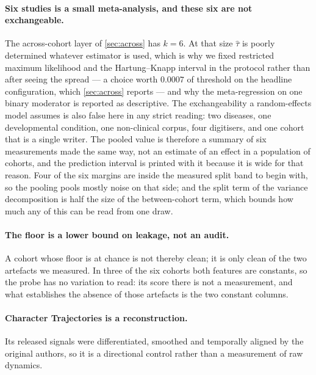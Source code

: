 \documentclass[10pt,a4paper]{article}
\begin{document}
\paragraph{Six studies is a small meta-analysis, and these six are not exchangeable.} The
across-cohort layer of \cref{sec:across} has $k = 6$. At that size $\hat\tau$ is poorly determined
whatever estimator is used, which is why we fixed restricted maximum likelihood and the
Hartung--Knapp interval in the protocol rather than after seeing the spread --- a choice worth
$0.0007$ of threshold on the headline configuration, which \cref{sec:across} reports --- and why the
meta-regression on one binary moderator is reported as descriptive. The exchangeability a
random-effects model assumes is also false here in any strict reading: two diseases, one
developmental condition, one non-clinical corpus, four digitisers, and one cohort that is a single
writer. The pooled value is therefore a summary of six measurements made the same way, not an
estimate of an effect in a population of cohorts, and the prediction interval is printed with it
because it is wide for that reason. Four of the six margins are inside the measured split band to
begin with, so the pooling pools mostly noise on that side; and the split term of the variance
decomposition is half the size of the between-cohort term, which bounds how much any of this can
be read from one draw.

\paragraph{The floor is a lower bound on leakage, not an audit.} A cohort whose floor is at chance
is not thereby clean; it is only clean of the two artefacts we measured. In three of the six cohorts
both features are constants, so the probe has no variation to read: its score there is not a
measurement, and what establishes the absence of those artefacts is the two constant columns.

\paragraph{Character Trajectories is a reconstruction.} Its released signals were differentiated,
smoothed and temporally aligned by the original authors, so it is a directional control rather than
a measurement of raw dynamics.
\end{document}
